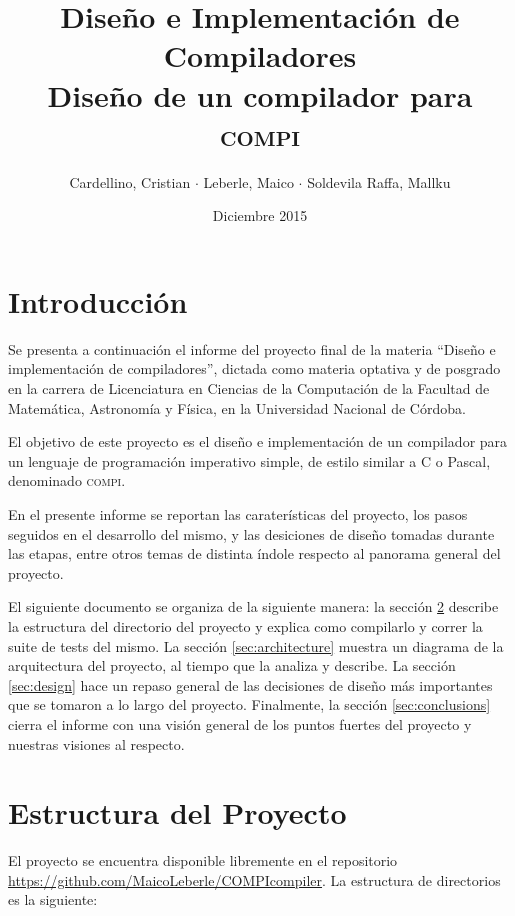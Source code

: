 \documentclass[12pt, a4paper, titlepage]{article}
\title{
  \large{Diseño e Implementación de Compiladores}\\
  \huge{Diseño de un compilador para \textsc{compi}}
}
\author{
  Cardellino, Cristian $\cdot$ Leberle, Maico $\cdot$ Soldevila Raffa, Mallku
}
\date{Diciembre 2015}
\begin{document}
  \maketitle

  \section{Introducción}

  Se presenta a continuación el informe del proyecto final de la materia
  ``Diseño e implementación de compiladores'', dictada como materia optativa y
  de posgrado en la carrera de Licenciatura en Ciencias de la Computación de la
  Facultad de Matemática, Astronomía y Física, en la Universidad Nacional de
  Córdoba.

  El objetivo de este proyecto es el diseño e implementación de un compilador
  para un lenguaje de programación imperativo simple, de estilo similar a C o
  Pascal, denominado \textsc{compi}.

  En el presente informe se reportan las caraterísticas del proyecto, los pasos
  seguidos en el desarrollo del mismo, y las desiciones de diseño tomadas
  durante las etapas, entre otros temas de distinta índole respecto al panorama
  general del proyecto.

  El siguiente documento se organiza de la siguiente manera: la sección
  \ref{sec:struct} describe la estructura del directorio del proyecto y explica
  como compilarlo y correr la suite de tests del mismo. La sección
  \ref{sec:architecture} muestra un diagrama de la arquitectura del proyecto, al
  tiempo que la analiza y describe. La sección \ref{sec:design} hace un repaso
  general de las decisiones de diseño más importantes que se tomaron a lo largo
  del proyecto. Finalmente, la sección \ref{sec:conclusions} cierra el informe
  con una visión general de los puntos fuertes del proyecto y nuestras visiones
  al respecto.

  \section{Estructura del Proyecto}\label{sec:struct}

  El proyecto se encuentra disponible libremente en el repositorio
  \url{https://github.com/MaicoLeberle/COMPIcompiler}. La estructura de
  directorios es la siguiente:

\end{document}
